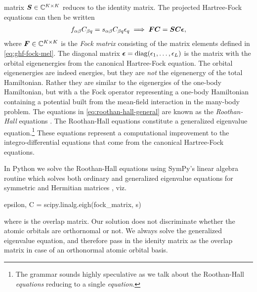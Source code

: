             matrix $\boldsymbol{S} \in \mathbb{C}^{K \times K}$ reduces to the identity
            matrix.
            The projected Hartree-Fock equations can then be written
            \begin{gather}
                f_{\alpha\beta} C_{\beta q}
                = s_{\alpha \beta} C_{\beta q} \epsilon_{q}
                \implies
                \boldsymbol{F} \boldsymbol{C} = \boldsymbol{S} \boldsymbol{C} \boldsymbol{\epsilon},
                \label{eq:roothan-hall-general}
            \end{gather}
            where $\boldsymbol{F} \in \mathbb{C}^{K \times K}$ is the \emph{Fock
            matrix} consisting of the matrix elements defined in
            \autoref{eq:ghf-fock-mel}.
            The diagonal matrix $\boldsymbol{\epsilon} = \operatorname{diag}(\epsilon_1, \dots,
            \epsilon_L)$ is the matrix with the orbital eigenenergies from the
            canonical Hartree-Fock equation.
            The orbital eigenenergies are indeed energies, but they are
            \emph{not} the eigenenergy of the total Hamiltonian.
            Rather they are similar to the eigenergies of the one-body
            Hamiltonian, but with a the Fock operator representing a one-body
            Hamiltonian containing a potential built from the mean-field
            interaction in the many-body problem.
            The equations in \autoref{eq:roothan-hall-general} are known as the
            \emph{Roothan-Hall} equations \cite{roothan, hall}.
            The Roothan-Hall equations constitute a generalized eigenvalue
            equation.\footnote{%
                The grammar sounds highly speculative as we talk about the
                Roothan-Hall \emph{equations} reducing to a single
                \emph{equation}.
            }
            These equations represent a computational improvement to the
            integro-differential equations that come from the canonical
            Hartree-Fock equations.

            In Python we solve the Roothan-Hall equations using SymPy's linear
            algebra routine  which solves both ordinary
            and generalized eigenvalue equations for symmetric and Hermitian
            matrices \cite{sympy}, viz.
            \begin{python}
epsilon, C = scipy.linalg.eigh(fock_matrix, s)
            \end{python}
            where  is the overlap matrix.
            Our solution does not discriminate whether the atomic orbitals are
            orthornomal or not.
            We always solve the generalized eigenvalue equation, and therefore
            pass in the idenity matrix as the overlap matrix in case of an
            orthonormal atomic orbital basis.

